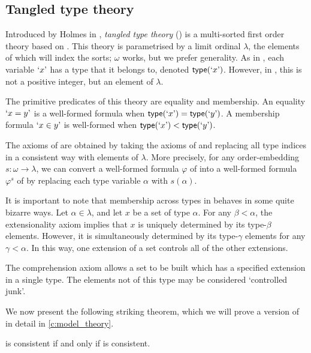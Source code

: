 \subsection{Tangled type theory}
\label{ss:theories:ttt}

Introduced by Holmes in \cite{holmes-ttt}, \emph{tangled type theory} ({\TTT}) is a multi-sorted first order theory based on {\TST}.
This theory is parametrised by a limit ordinal \( \lambda \), the elements of which will index the sorts; \( \omega \) works, but we prefer generality.
As in {\TST}, each variable \( \mquote{x} \) has a type that it belongs to, denoted \( \ttype(\mquote x) \).
However, in {\TTT}, this is not a positive integer, but an element of \( \lambda \).

The primitive predicates of this theory are equality and membership.
An equality \( \mquote{x = y} \) is a well-formed formula when \( \ttype(\mquote{x}) = \ttype(\mquote{y}) \).
A membership formula \( \mquote{x \in y} \) is well-formed when \( \ttype(\mquote{x}) < \ttype(\mquote{y}) \).

The axioms of {\TTT} are obtained by taking the axioms of {\TST} and replacing all type indices in a consistent way with elements of \( \lambda \).
More precisely, for any order-embedding \( s : \omega \to \lambda \), we can convert a well-formed formula \( \varphi \) of {\TST} into a well-formed formula \( \varphi^s \) of {\TTT} by replacing each type variable \( \alpha \) with \( s(\alpha) \).

It is important to note that membership across types in {\TTT} behaves in some quite bizarre ways.
Let \( \alpha \in \lambda \), and let \( x \) be a set of type \( \alpha \).
For any \( \beta < \alpha \), the extensionality axiom implies that \( x \) is uniquely determined by its type-\( \beta \) elements.
However, it is simultaneously determined by its type-\( \gamma \) elements for any \( \gamma < \alpha \).
In this way, one extension of a set controls all of the other extensions.

The comprehension axiom allows a set to be built which has a specified extension in a single type.
The elements not of this type may be considered `controlled junk'.

We now present the following striking theorem, which we will prove a version of in detail in \cref{c:model_theory}.

\begin{theorem*}[Holmes]
  {\NF} is consistent if and only if {\TTT} is consistent. \cite{holmes-ttt}
\end{theorem*}


